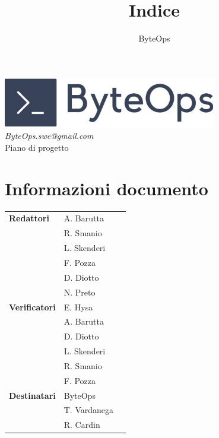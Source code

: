 \documentclass{article}
\title{\textbf{\fontsize{30}{6}\selectfont Indice}}
\author{\fontsize{14}{6}\selectfont ByteOps}
\date{}
\begin{document}
\pagestyle{fancy}
\begin{center}
    \includegraphics[width = 0.7\textwidth]{../Images/logo.png} \\
    \vspace{0.2cm}
    \textcolor[RGB]{60, 60, 60}{\textit{ByteOps.swe@gmail.com}} \\
    \vspace{1cm}
    \fontsize{16}{6}\selectfont Piano di progetto \\
    \vspace{0.5cm}
\end{center}

\section*{Informazioni documento}
\def\arraystretch{1.2}
\begin{tabular}{>{\raggedleft\arraybackslash}p{}|>{\raggedright\arraybackslash}p{}c}
    \hline
    \addlinespace
    \textbf{Redattori}    & A. Barutta\\ & R. Smanio\\ & L. Skenderi\\ & F. Pozza\\ & D. Diotto \\ & N. Preto \vspace{10pt} \\
    \textbf{Verificatori} & E. Hysa\\ & A. Barutta\\ & D. Diotto\\ & L. Skenderi\\ & R. Smanio\\ & F. Pozza \vspace{10pt} \\
    \textbf{Destinatari}  & ByteOps\\ & T. Vardanega \\ & R. Cardin \vspace{10pt} \\
\end{tabular}
\pagebreak
\end{document}
